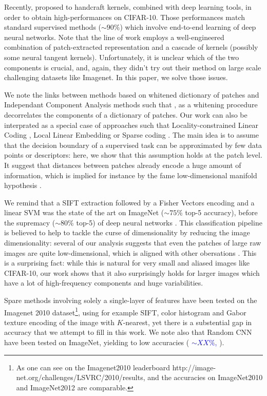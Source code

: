 \documentclass{article}
\newcommand{\Edouard}[1]{\textcolor{blue}{#1}}
\begin{document}
Recently, \citep{li2019enhanced,shankar2020neural} proposed to handcraft kernels, combined with deep learning tools, in order to obtain high-performances on CIFAR-10.
Those performances  match standard supervised methods ($\sim 90\%$) which involve end-to-end learning of deep neural networks.
Note that the line of work \citep{li2019enhanced,shankar2020neural,mairal2016end} employs a well-engineered combination of patch-extracted representation and a cascade of kernels (possibly some neural tangent kernels).
Unfortunately, it is unclear which of the two components is crucial, and, again, they didn't try out their method on large scale challenging datasets like Imagenet.
In this paper, we solve those issues.

{We  note the links between methods based on whitened dictionary of patches and Independant Component Analysis methods such that \citep{ngiam2010tiled}, as a whitening procedure decorrelates the components of a dictionary of patches. Our work can also be interprated as a special case of approaches such that Locality-constrained Linear Coding \citep{russakovsky2015imagenet,yu2010improved}, Local Linear Embedding \citep{Roweis2323} or Sparse coding \citep{bo2013multipath}. The main idea is to assume that the  decision boundary of a supervised task can be approximated by few data points or descriptors: here, we show that this assumption holds at the patch level. It suggest that distances between patches already encode a huge amount of information, which is implied for instance by the fame low-dimensional manifold hypothesis 
\citep{fefferman2016testing}. 

We remind that a SIFT extraction \cite{lowe2004distinctive} followed by a Fisher Vectors  encoding \citep{sanchez2013image} and a linear SVM was the state of the art on ImageNet ($\sim 75\% $ top-5 accuracy), before the supremacy ($\sim 80$\% top-5) of deep neural networks \citet{krizhevsky2012imagenet}. This classification pipeline is believed to help to tackle the curse of dimensionality by reducing the image dimensionality: several of our analysis  suggests that even the patches of large raw images are quite low-dimensional, which is aligned with other obersations
\citep{Oyallon_2017_CVPR}. This is a surprising fact: while this is natural for very small and aliased  images like CIFAR-10, our work shows that it also surprisingly holds for larger images which have a lot of high-frequency components and huge variabilities.

Spare methods involving solely a single-layer of  features  have been tested on the Imagenet 2010 dataset\footnote{ As one can see on the Imagenet2010 leaderboard http://image-net.org/challenges/LSVRC/2010/results, and the accuracies on ImageNet2010 and ImageNet2012 are comparable.}, using for example SIFT, color histogram and Gabor texture encoding of the image with $K$-nearest, yet there is a substential gap in accuracy that we attempt to fill in this work. We note also that Random CNN have been tested on ImageNet, yielding to low accuracies (\Edouard{ $\sim XX\%$, \citep{arandjelovic2017look}}).

}
\end{document}
